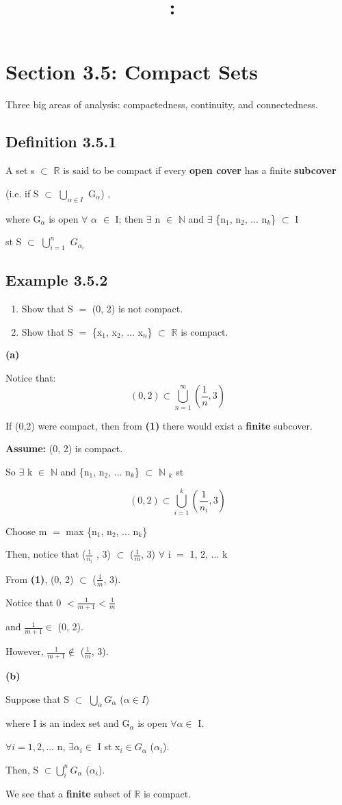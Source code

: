 \documentclass{article}
\title{
    \vspace{2in}
    \textmd{\textbf{\hmwkClass:\ \hmwkTitle}}\\
    \normalsize\vspace{0.1in}\small\vspace{0.1in}\large{\textit{\hmwkClassInstructor}}
    \vspace{3in}
}
\author{\hmwkAuthorName}
\date{}
\newcommand{\mt}[1]{\ensuremath{#1}}
\newcommand\bsc[2][\DefaultOpt]{%
  \def\DefaultOpt{#2}%
  \section[#1]{#2}%
}
\newcommand\ssc[2][\DefaultOpt]{%
  \def\DefaultOpt{#2}%
  \subsection[#1]{#2}%
}
\newcommand{\balist}{\begin{enumerate}[label=\alph*.]}
\newcommand{\elist}{\end{enumerate}}
\newcommand{\as}[1]{\textbf{Assume: } #1}
\newcommand{\bpth}[1]{\textbf{(#1)}}
\newcommand{\step}[2]{\begin{equation}\tag{#2}#1\end{equation}}
\newcommand{\dbs}[3]{\mt{#1_{#2_#3}}}
\newcommand{\br}{\mt{\mathbb{R}} }       %
\newcommand{\bn}{\mt{\mathbb{N}} }       %
\newcommand{\fa}{\mt{\forall} }          %
\newcommand{\afa}{\mt{\alpha} }
\newcommand{\mem}{\mt{\in} }
\newcommand{\exs}{\mt{\exists} }
\newcommand{\sbs}{\mt{\subset} }         %
\newcommand{\fs}[2]{\{\uw{#1}{1}, \uw{#1}{2}, ... \uw{#1}{#2}\}}
\newcommand{\eql}{\mt{=} }
\newcommand{\uw}[2]{#1\mt{_#2}}
\newcommand{\frc}[2]{\mt{\frac{#1}{#2}}}
\newcommand{\urng}[2]{\mt{\bigcup_{#1}^{#2}}}
\begin{document}
\bsc{Section 3.5: Compact Sets}{
Three big areas of analysis: compactedness, continuity, and connectedness.

\ssc{Definition 3.5.1}{A set s \sbs \br  is said to be compact if every \textbf{open cover} has a finite \textbf{subcover} \

(i.e. if S \sbs \urng{\alpha \in I}{} \uw{G}{\afa}) , \

where \uw{G}{\afa} is open \fa \afa \mem I; then \exs n \mem \bn and \exs \fs{n}{k} \sbs I \

st S \sbs \urng{i=1}{n} \dbs{G}{\alpha}{i}
}

\ssc{Example 3.5.2}{
\balist
\item Show that S \eql (0, 2) is not compact.
\item Show that S \eql \{\uw{x}{1}, \uw{x}{2}, ... \uw{x}{n}\} \sbs \br is compact. 
\elist

\textbf{(a)} \

Notice that:
\step{(0, 2) \sbs \urng{n=1}{\infty} (\frac{1}{n}, 3)}{1}
}

If (0,2) were compact, then from \bpth{1} there would exist a \textbf{finite} subcover.

\as{(0, 2) is compact.} \

So \exs k \mem \bn and \{\uw{n}{1}, \uw{n}{2}, ... \uw{n}{k}\} \sbs \uw{\bn}{k} st

\step{(0, 2) \sbs \urng{i=1}{k} (\frac{1}{n_i}, 3)}{2}

Choose m \eql max \fs{n}{k} \

Then, notice that (\frc{1}{n_i} , 3) \sbs (\frc{1}{m}, 3) \fa i \eql 1, 2, ... k \

From \bpth{1}, (0, 2) $\sbs$ ($\frac{1}{m}$, 3).

Notice that 0 $< \frac{1}{m + 1} < \frac{1}{m}$ \

and $\frac{1}{m + 1} \in$ (0, 2). \

However, $\frac{1}{m + 1} \not\in$ ($\frac{1}{m}$, 3).

\textbf{(b)} \

Suppose that S $\sbs$ $\bigcup_\alpha G_\alpha$ ($\alpha \in I$)

where I is an index set and G$_\alpha$ is open $\fa \alpha \in$ I.

$\fa i = 1, 2,...$ n, $\exists \alpha_i \in$ I st x$_i \in G_\alpha$ ($\alpha_i$). \

Then, S $\sbs \bigcup^n_i G_\alpha$ ($\alpha_i$).

We see that a \textbf{finite} subset of $\br$ is compact.
}
\end{document}
